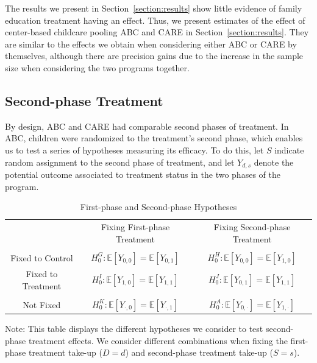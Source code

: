 \noindent The results we present in Section~\ref{section:results} show little evidence of family education treatment having an effect. Thus, we present estimates of the effect of center-based childcare pooling ABC and CARE in Section~\ref{section:results}. They are similar to the effects we obtain when considering either ABC or CARE by themselves, although there are precision gains due to the increase in the sample size when considering the two programs together. 


\subsection{Second-phase Treatment}

\noindent By design, ABC and CARE had comparable second phases of treatment. In ABC, children were randomized to the treatment's second phase, which enables us to test a series of hypotheses measuring its efficacy. To do this, let $S$ indicate random assignment to the second phase of treatment, and let $Y_{d,s}$ denote the potential outcome associated to treatment status in the two phases of the program.

\begin{table}[H] 
\begin{threeparttable}
\caption{First-phase and Second-phase Hypotheses}
\label{table:hypotheses}
\centering 
\begin{tabular}{ccc} \toprule
 & Fixing First-phase Treatment & Fixing Second-phase Treatment \\ \\ \midrule
Fixed to Control       & $H_{0}^G: \mathbb{E} \left[ Y_{0,0} \right] = \mathbb{E} \left[ Y_{0,1} \right]$ & $H_{0}^H: \mathbb{E} \left[ Y_{0,0} \right] = \mathbb{E} \left[ Y_{1,0} \right]$ \\
Fixed to Treatment  & $H_{0}^I: \mathbb{E} \left[ Y_{1,0} \right] = \mathbb{E} \left[ Y_{1,1} \right]$ & $H_{0}^J: \mathbb{E} \left[ Y_{0,1} \right] = \mathbb{E} \left[ Y_{1,1} \right]$ \\ \\ \midrule
Not Fixed                 & $H_{0}^K: \mathbb{E} \left[ Y_{\cdot,0} \right] = \mathbb{E} \left[ Y_{\cdot,1} \right]$ &  $H_{0}^A: \mathbb{E} \left[ Y_{0,\cdot} \right] = \mathbb{E} \left[ Y_{1,\cdot} \right]$ \\  \toprule
\end{tabular}
\begin{tablenotes}
\footnotesize
\item Note: This table displays the different hypotheses we consider to test second-phase treatment effects. We consider different combinations when fixing the first-phase treatment take-up ($D=d$) and second-phase treatment take-up ($S=s$).
\end{tablenotes}
\end{threeparttable}
\end{table}

